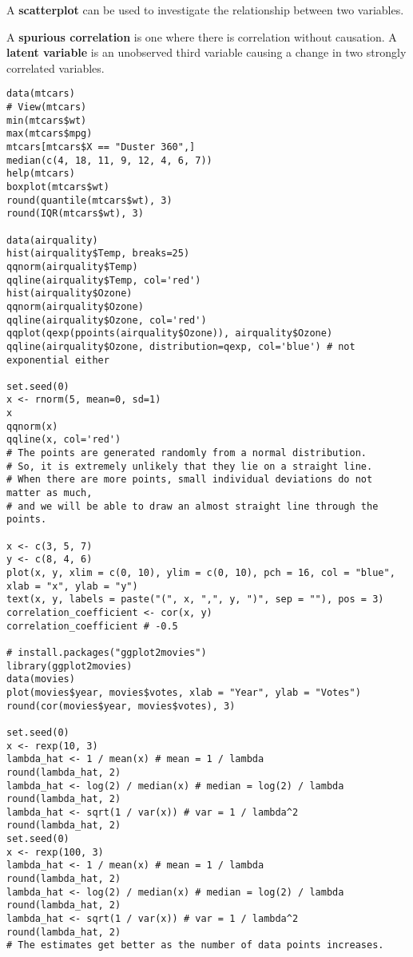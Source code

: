 \begin{paracol}{2}
A \textbf{scatterplot} can be used to investigate the relationship between two variables.

A \textbf{spurious correlation} is one where there is correlation without causation. A \textbf{latent variable} is an unobserved third variable causing a change in two strongly correlated variables.

\end{paracol}

\begin{verbatim}
data(mtcars)
# View(mtcars)
min(mtcars$wt)
max(mtcars$mpg)
mtcars[mtcars$X == "Duster 360",]
median(c(4, 18, 11, 9, 12, 4, 6, 7))
help(mtcars)
boxplot(mtcars$wt)
round(quantile(mtcars$wt), 3)
round(IQR(mtcars$wt), 3)

data(airquality)
hist(airquality$Temp, breaks=25)
qqnorm(airquality$Temp)
qqline(airquality$Temp, col='red')
hist(airquality$Ozone)
qqnorm(airquality$Ozone)
qqline(airquality$Ozone, col='red')
qqplot(qexp(ppoints(airquality$Ozone)), airquality$Ozone)
qqline(airquality$Ozone, distribution=qexp, col='blue') # not exponential either

set.seed(0)
x <- rnorm(5, mean=0, sd=1)
x
qqnorm(x)
qqline(x, col='red')
# The points are generated randomly from a normal distribution.
# So, it is extremely unlikely that they lie on a straight line.
# When there are more points, small individual deviations do not matter as much,
# and we will be able to draw an almost straight line through the points.

x <- c(3, 5, 7)
y <- c(8, 4, 6)
plot(x, y, xlim = c(0, 10), ylim = c(0, 10), pch = 16, col = "blue", xlab = "x", ylab = "y")
text(x, y, labels = paste("(", x, ",", y, ")", sep = ""), pos = 3)
correlation_coefficient <- cor(x, y)
correlation_coefficient # -0.5

# install.packages("ggplot2movies")
library(ggplot2movies)
data(movies)
plot(movies$year, movies$votes, xlab = "Year", ylab = "Votes")
round(cor(movies$year, movies$votes), 3)

set.seed(0)
x <- rexp(10, 3)
lambda_hat <- 1 / mean(x) # mean = 1 / lambda
round(lambda_hat, 2)
lambda_hat <- log(2) / median(x) # median = log(2) / lambda
round(lambda_hat, 2)
lambda_hat <- sqrt(1 / var(x)) # var = 1 / lambda^2
round(lambda_hat, 2)
set.seed(0)
x <- rexp(100, 3)
lambda_hat <- 1 / mean(x) # mean = 1 / lambda
round(lambda_hat, 2)
lambda_hat <- log(2) / median(x) # median = log(2) / lambda
round(lambda_hat, 2)
lambda_hat <- sqrt(1 / var(x)) # var = 1 / lambda^2
round(lambda_hat, 2)
# The estimates get better as the number of data points increases.

\end{verbatim}
